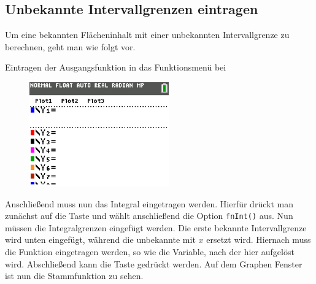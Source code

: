 \subsection{Unbekannte Intervallgrenzen eintragen}
Um eine bekannten Flächeninhalt mit einer unbekannten Intervallgrenze zu berechnen, geht man wie folgt vor.
\begin{paracol}{2}
\begin{flushleft}
	Eintragen der Ausgangsfunktion in das Funktionsmenü bei 
\end{flushleft}	
\switchcolumn
\begin{flushright}
\begin{figure}
	\includegraphics[width=6cm]{Media/GRT/Visualisierung/unbekannte_intervallgrenze/unbekannte_intervallgrenze_1.gif}
	\caption{}
\end{figure}
\end{flushright}
\end{paracol}
Anschließend muss nun das Integral eingetragen werden. Hierfür drückt man zunächst auf die Taste und wählt anschließend die Option \texttt{fnInt()} aus. Nun müssen die Integralgrenzen eingefügt werden. Die erste bekannte Intervallgrenze wird unten eingefügt, während die unbekannte mit $x$ ersetzt wird. Hiernach muss die Funktion eingetragen werden, so wie die Variable, nach der hier aufgelöst wird. Abschließend kann die Taste  gedrückt werden. Auf dem Graphen Fenster ist nun die Stammfunktion zu sehen.
\pagebreak
